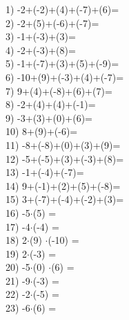 \documentclass[a4paper,10pt]{article}
\begin{document}
1)   -2+(-2)+(4)+(-7)+(6)=
\vspace{0.5cm}\\2)   -2+(5)+(-6)+(-7)=
\vspace{0.5cm}\\3)   -1+(-3)+(3)=
\vspace{0.5cm}\\4)   -2+(-3)+(8)=
\vspace{0.5cm}\\5)   -1+(-7)+(3)+(5)+(-9)=
\vspace{0.5cm}\\6)   -10+(9)+(-3)+(4)+(-7)=
\vspace{0.5cm}\\7)   9+(4)+(-8)+(6)+(7)=
\vspace{0.5cm}\\8)   -2+(4)+(4)+(-1)=
\vspace{0.5cm}\\9)   -3+(3)+(0)+(6)=
\vspace{0.5cm}\\10)   8+(9)+(-6)=
\vspace{0.5cm}\\11)   -8+(-8)+(0)+(3)+(9)=
\vspace{0.5cm}\\12)   -5+(-5)+(3)+(-3)+(8)=
\vspace{0.5cm}\\13)   -1+(-4)+(-7)=
\vspace{0.5cm}\\14)   9+(-1)+(2)+(5)+(-8)=
\vspace{0.5cm}\\15)   3+(-7)+(-4)+(-2)+(3)=
\vspace{0.5cm}\\16)   -5$\cdot$(5) =
\vspace{0.5cm}\\17)   -4$\cdot$(-4) =
\vspace{0.5cm}\\18)   2$\cdot$(9) $\cdot$(-10) =
\vspace{0.5cm}\\19)   2$\cdot$(-3) =
\vspace{0.5cm}\\20)   -5$\cdot$(0) $\cdot$(6) =
\vspace{0.5cm}\\21)   -9$\cdot$(-3) =
\vspace{0.5cm}\\22)   -2$\cdot$(-5) =
\vspace{0.5cm}\\23)   -6$\cdot$(6) =
\end{document}
